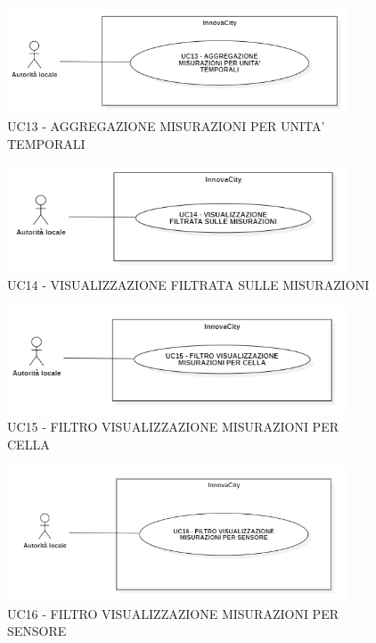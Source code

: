 \begin{figure}[H]
    \centering
    \includegraphics[width=0.9\textwidth]{../Images/uc13.PNG}
    \caption{UC13 - AGGREGAZIONE MISURAZIONI PER UNITA' TEMPORALI}
\end{figure}

\begin{figure}[H]
    \centering
    \includegraphics[width=0.9\textwidth]{../Images/uc14.PNG}
    \caption{UC14 - VISUALIZZAZIONE FILTRATA SULLE MISURAZIONI}
\end{figure}

\begin{figure}[H]
    \centering
    \includegraphics[width=0.9\textwidth]{../Images/uc15.PNG}
    \caption{UC15 - FILTRO VISUALIZZAZIONE MISURAZIONI PER CELLA}
\end{figure}

\begin{figure}[H]
    \centering
    \includegraphics[width=0.9\textwidth]{../Images/uc16.PNG}
    \caption{UC16 - FILTRO VISUALIZZAZIONE MISURAZIONI PER SENSORE}
\end{figure}
